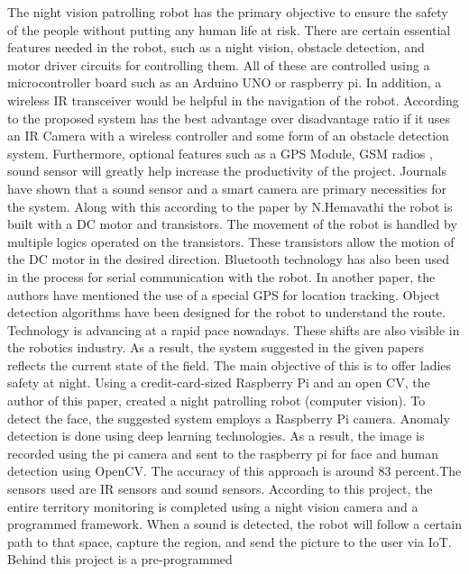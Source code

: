 \documentclass[journal]{IEEEtran}
\begin{document}
The night vision patrolling robot has the primary
objective to ensure the safety of the people without
putting any human life at risk. There are certain
essential features needed in the robot, such as a night
vision, obstacle detection, and motor driver circuits
for controlling them\cite{[1]}. All of these are controlled
using a microcontroller board such as an Arduino UNO
or raspberry pi. In addition, a wireless IR transceiver
would be helpful in the navigation of the robot\cite{[3]}.
According to \cite{[1]} the proposed system has the best
advantage over disadvantage ratio if it uses an IR
Camera with a wireless controller and some form of
an obstacle detection system. Furthermore, optional
features such as a GPS Module, GSM radios \cite{[3]}, sound
sensor\cite{[1]} will greatly help increase the productivity
of the project.
Journals have shown that a sound sensor and a smart
camera are primary necessities for the system. Along
with this according to the paper by N.Hemavathi the
robot is built with a DC motor and transistors.
The movement of the robot is handled by multiple
logics operated on the transistors. These transistors
allow the motion of the DC motor in the desired
direction\cite{[6]}. Bluetooth technology has also been
used in the process for serial communication with
the robot\cite{[7]}. In another paper, the authors have
mentioned the use of a special GPS for location tracking.
Object detection algorithms have been designed for the
robot to understand the route\cite{[8]}.
Technology is advancing at a rapid pace nowadays. These
shifts are also visible in the robotics industry. As a
result, the system suggested in the given papers reflects
the current state of the field. The main objective of this
is to offer ladies safety at night. Using a credit-card-sized
Raspberry Pi and an open CV, the author of this paper,
created a night patrolling robot (computer vision).\cite{[11]}
To detect the face, the suggested system employs a Raspberry
Pi camera. Anomaly detection is done using deep learning
technologies\cite{[13]}. As a result, the image is recorded using
the pi camera and sent to the raspberry pi for face and
human detection using OpenCV.  The accuracy of this
approach is around 83 percent\cite{[11]}.The sensors used are
IR sensors and sound sensors. According to this project,
the entire territory monitoring is completed using a night
vision camera and a programmed framework. When a sound is
detected, the robot will follow a certain path to that
space, capture the region, and send the picture to the
user via IoT. Behind this project is a pre-programmed
\end{document}
